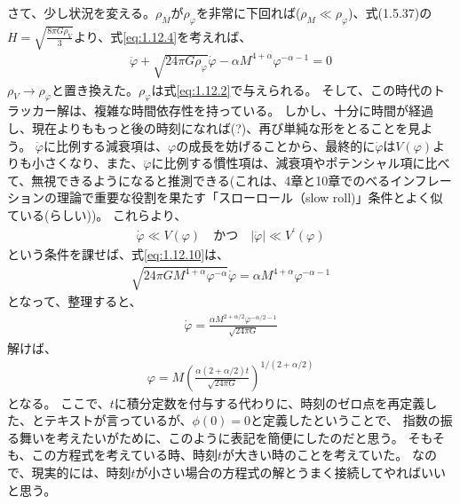 \documentclass[11pt]{ltjsarticle}
\theoremstyle{plain}
\theoremstyle{break}
\begin{document}
さて、少し状況を変える。$\rho_M$が$\rho_\varphi$を非常に下回れば($\rho_M\ll \rho_{\varphi}$)、式(1.5.37)の$H=\sqrt{\frac{8\pi G \rho_V}{3}}$より、式\eqref{eq:1.12.4}を考えれば、
\begin{align}
  \ddot{\varphi}+\sqrt{24 \pi G \rho_{\varphi}} \dot{\varphi}-\alpha M^{4+\alpha} \varphi^{-\alpha-1}=0 \label{eq:1.12.10}
\end{align}%
$\rho_V \to \rho_\varphi$と置き換えた。$\rho_\varphi$は式\eqref{eq:1.12.2}で与えられる。
そして、この時代のトラッカー解は、複雑な時間依存性を持っている。
しかし、十分に時間が経過し、現在よりももっと後の時刻になれば(?)、再び単純な形をとることを見よう。
$\dot{\varphi}$に比例する減衰項は、$\varphi$の成長を妨げることから、最終的に$\dot{\varphi}$は$V(\varphi)$よりも小さくなり、また、$\ddot{\varphi}$に比例する慣性項は、減衰項やポテンシャル項に比べて、無視できるようになると推測できる(これは、4章と10章でのべるインフレーションの理論で重要な役割を果たす「スローロール（slow roll)」条件とよく似ている(らしい))。
これらより、
\begin{align}
\dot{\varphi} \ll V(\varphi )\quad  かつ  \quad |\ddot{\varphi}| \ll  V^{\prime}(\varphi)
\end{align}%
という条件を課せば、式\eqref{eq:1.12.10}は、
\begin{align}
  \sqrt{24 \pi G M^{4+\alpha} \varphi^{-\alpha}} \dot{\varphi}=\alpha M^{4+\alpha} \varphi^{-\alpha-1}
\end{align}%
となって、整理すると、
\begin{align}
  \dot{\varphi}=\frac{\alpha M^{2+\alpha / 2} \varphi^{-\alpha / 2-1}}{\sqrt{24 \pi G}}
\end{align}%
解けば、
\begin{align}
  \varphi=M\left(\frac{\alpha(2+\alpha / 2) t}{\sqrt{24 \pi G}}\right)^{1 /(2+\alpha / 2)} \label{eq:1.12.12}
 \end{align}%
となる。
ここで、$t$に積分定数を付与する代わりに、時刻のゼロ点を再定義した、とテキストが言っているが、$\phi(0) = 0$と定義したということで、
指数の振る舞いを考えたいがために、このように表記を簡便にしたのだと思う。
そもそも、この方程式を考えている時、時刻$t$が大きい時のことを考えていた。
なので、現実的には、時刻$t$が小さい場合の方程式の解とうまく接続してやればいいと思う。
\end{document}
